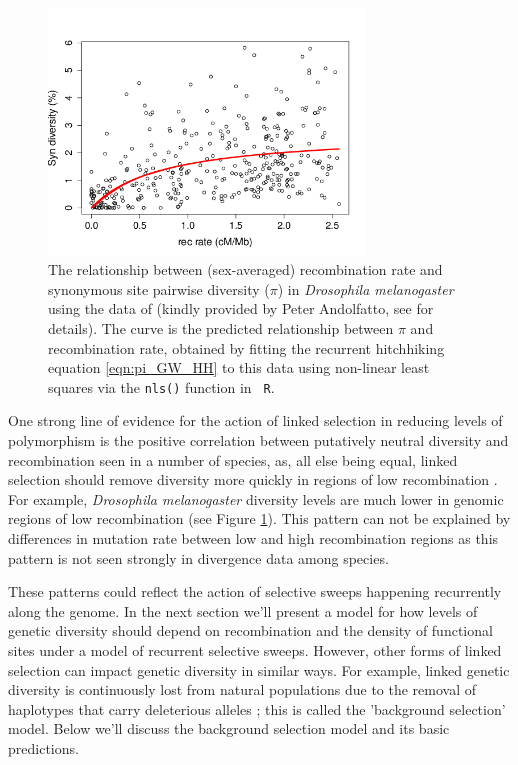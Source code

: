 \begin{figure}
\begin{center}
\includegraphics[width=0.75\textwidth]{figures/Genomewide_HH.png}
\end{center}
\caption{The relationship between (sex-averaged) recombination rate and synonymous
  site pairwise diversity ($\pi$) in {\it Drosophila melanogaster}
  using the data of \citep{Shapiro:07} (kindly provided by Peter
  Andolfatto, see \citet{sella2009pervasive} for details). The curve is the
  predicted relationship between $\pi$ and recombination rate, obtained
  by fitting the recurrent hitchhiking equation \eqref{eqn:pi_GW_HH} to this data 
 using non-linear least squares via the {\tt nls()} function in {\tt
   R}.} \label{fig:GW_hitchhiking_reduction}  %
\end{figure}

One strong line of evidence for the action of linked selection in reducing levels of
polymorphism is the positive correlation between putatively
neutral diversity and recombination seen in a number of species, as, all
else being equal, linked selection should remove diversity more quickly in regions of low recombination 
\citep{Aguade:89,Begun:92,Wiehe:93,Cutter:10,Cai:09}. For example, {\it Drosophila melanogaster} diversity
levels are much lower in genomic regions of low recombination (see
Figure \ref{fig:GW_hitchhiking_reduction}). This pattern can not be
explained by differences in mutation rate between low and high
recombination regions as this pattern is not seen strongly in
divergence data among species.

These patterns could reflect the action of selective sweeps happening
recurrently along the genome. In the next section we'll present a model for how levels of
genetic diversity should depend on recombination and the density of
functional sites under a model of recurrent selective sweeps.
However, other forms of linked selection can impact genetic
diversity in similar ways. For example, linked genetic diversity is
continuously lost from natural populations due to the removal of
haplotypes that carry deleterious alleles
\citep{Charlesworth:95,Hudson:95}; this is called the 'background selection'
model. Below we'll discuss the background selection model and its
basic predictions.

